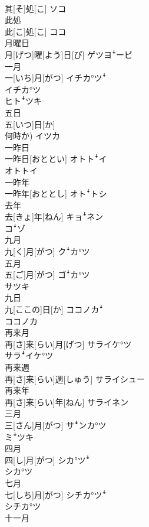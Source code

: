\documentclass[8pt]{extreport}
\begin{document}
\begin{CJK}{UTF8}{min}
\\	其[そ]処[こ]	ソコ
\\	此処	
\\	此[こ]処[こ]	ココ
\\	月曜日	
\\	月[げつ]曜[よう]日[び]	ゲツヨꜜービ
\\	一月	
\\	一[いち]月[がつ]	イチカ°ツꜜ 
\\	イチカ°ツ 
\\	ヒトꜜツキ
\\	五日	
\\	五[いつ]日[か] 
\\	何時か)	イツカ
\\	一昨日	
\\	一昨日[おととい]	オトトꜜイ 
\\	オトトイ
\\	一昨年	
\\	一昨年[おととし]	オトꜜトシ
\\	去年	
\\	去[きょ]年[ねん]	キョꜜネン 
\\	コꜜゾ
\\	九月	
\\	九[く]月[がつ]	クꜜカ°ツ
\\	五月	
\\	五[ご]月[がつ]	ゴꜜカ°ツ 
\\	サツキ
\\	九日	
\\	九[ここの]日[か]	ココノカꜜ 
\\	ココノカ
\\	再来月	
\\	再[さ]来[らい]月[げつ]	サライケ°ツ 
\\	サラꜜイケ°ツ
\\	再来週	
\\	再[さ]来[らい]週[しゅう]	サライシュー
\\	再来年	
\\	再[さ]来[らい]年[ねん]	サライネン
\\	三月	
\\	三[さん]月[がつ]	サꜜンカ°ツ 
\\	ミꜜツキ
\\	四月	
\\	四[し]月[がつ]	シカ°ツꜜ 
\\	シカ°ツ
\\	七月	
\\	七[しち]月[がつ]	シチカ°ツꜜ 
\\	シチカ°ツ
\\	十一月	

\end{CJK}
\end{document}
